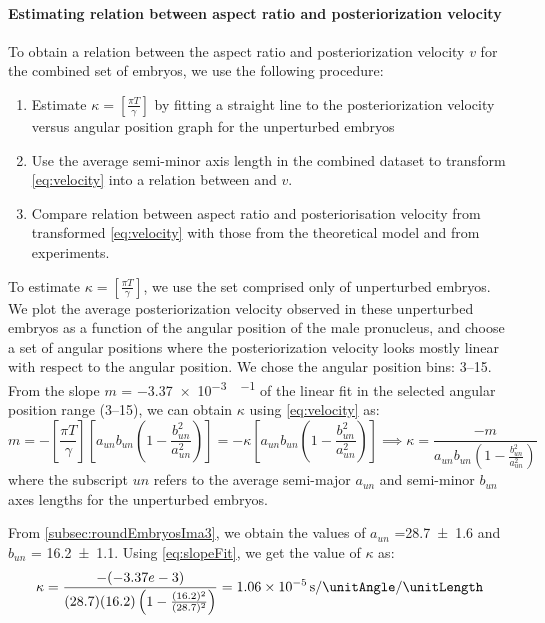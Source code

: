\paragraph{Estimating relation between aspect ratio and posteriorization velocity}
To obtain a relation between the aspect ratio \aspectRatio and posteriorization velocity $v$ for the combined set of embryos, we use the following procedure:
\begin{enumerate}
    \item Estimate $\kappa = \left[\frac{\pi T}{\gamma}\right]$ by fitting a straight line to the posteriorization velocity versus angular position graph for the unperturbed embryos
    \item Use the average semi-minor axis length in the combined dataset to transform \eqref{eq:velocity} into a relation between \aspectRatio and $v$.
    \item Compare relation between aspect ratio and posteriorisation velocity from transformed \eqref{eq:velocity} with those from the theoretical model and from experiments.
\end{enumerate}

To estimate $\kappa = \left[\frac{\pi T}{\gamma}\right]$, we use the set comprised only of unperturbed embryos. We plot the average posteriorization velocity observed in these unperturbed embryos as a function of the angular position of the male pronucleus, and choose a set of angular positions where the posteriorization velocity looks mostly linear with respect to the angular position. We chose the angular position bins: \SIrange{3}{15}{\unitAngle}. From the slope $m$ = \SI{-3.37e-3}{\unitPostVel\per\unitAngle} of the linear fit in the selected angular position range (\SIrange{3}{15}{\unitAngle}), we can obtain $\kappa$ using \eqref{eq:velocity} as:
\begin{equation} \label{eq:slopeFit}
    m = - \left[\frac{\pi T}{\gamma}\right] \left[a_{un}b_{un}\left(1 - \frac{b_{un}^2}{a_{un}^2}\right)\right] = - \kappa \left[a_{un}b_{un}\left(1 - \frac{b_{un}^2}{a_{un}^2}\right)\right] \implies \kappa = \frac{-m}{a_{un}b_{un}\left(1 - \frac{b_{un}^2}{a_{un}^2}\right)}
\end{equation}
where the subscript $un$ refers to the average semi-major $a_{un}$ and semi-minor $b_{un}$ axes lengths for the unperturbed embryos.

From \autoref{subsec:roundEmbryosIma3}, we obtain the values of $a_{un}$ =\SI{28.7 +- 1.6}{\unitLength} and $b_{un}$ = \SI{16.2 +- 1.1}{\unitLength}. Using \eqref{eq:slopeFit}, we get the value of $\kappa$ as:
\begin{equation}\label{eq:kappa}
    \kappa = \frac{-(-3.37e-3)}{(28.7)(16.2)\left(1 - \frac{(16.2)^2}{(28.7)^2}\right)} = \SI{1.06e-5}{\per\second\per\unitAngle\per\unitLength}
\end{equation}

